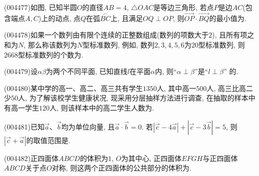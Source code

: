 \item (004477)如图, 已知半圆$O$的直径$AB=4$, $\triangle OAC$是等边三角形, 若点$P$是边$AC$(包含端点$A,C$)上的动点, 点$Q$在弧$\overset\frown{BC}$上, 且满足$OQ\perp OP$, 则$\overrightarrow{OP}\cdot \overrightarrow{BQ}$的最小值为.
\begin{center}
\end{center}
\item (004478)如果一个数列由有限个连续的正整数组成(数列的项数大于$2$), 且所有项之和为$N$, 那么称该数列为$N$型标准数列, 例如, 数列$2, 3, 4, 5, 6$为$20$型标准数列, 则$2668$型标准数列的个数为.
\item (004479)设$\alpha \beta$为两个不同平面, 已知直线$l$在平面$\alpha$内, 则``$\alpha \perp \beta$''是``$l\perp \beta$''
的.
\item (004480)某中学的高一、高二、高三共有学生$1350$人, 其中高一$500$人, 高三比高二少$50$人, 为了解该校学生健康状况, 现采用分层抽样方法进行调查, 在抽取的样本中有高一学生$120$人, 则该样本中的高二学生人数为.
\item (004481)已知$\overrightarrow{a}$、$\overrightarrow b$均为单位向量, 且$\overrightarrow a\cdot\overrightarrow b=0$. 若$|\overrightarrow c-4\overrightarrow a |+| \overrightarrow c-3\overrightarrow b |=5$, 则$| \overrightarrow c+\overrightarrow a|$的取值范围是.
\fourch{$[3,\sqrt{10}]$}{$[3,5]$}{$[3,4]$}{$[ \sqrt{10},5]$}
\item (004482)正四面体$ABCD$的体积为$1$, $O$为其中心, 正四面体$EFGH$与正四面体$ABCD$关于点$O$对称, 则这两个正四面体的公共部分的体积为.
